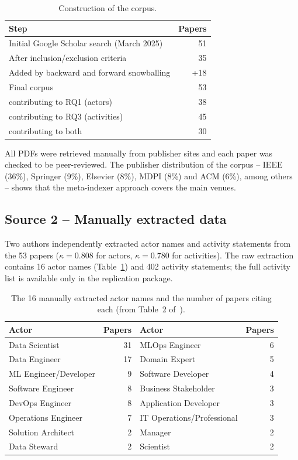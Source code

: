 \documentclass[11pt,a4paper]{article}
\begin{document}
\begin{table}[h]
\centering
\caption{Construction of the corpus.}
\small
\begin{tabular}{@{}lr@{}}
\toprule
Step & Papers \\
\midrule
Initial Google Scholar search (March 2025) & 51 \\
After inclusion/exclusion criteria & 35 \\
Added by backward and forward snowballing & +18 \\
Final corpus & 53 \\
\quad contributing to RQ1 (actors) & 38 \\
\quad contributing to RQ3 (activities) & 45 \\
\quad contributing to both & 30 \\
\bottomrule
\end{tabular}
\end{table}

All PDFs were retrieved manually from publisher sites and each paper was checked to be peer-reviewed. The publisher distribution of the corpus -- IEEE (36\%), Springer (9\%), Elsevier (8\%), MDPI (8\%) and ACM (6\%), among others -- shows that the meta-indexer approach covers the main venues.

\subsection{Source 2 -- Manually extracted data}

Two authors independently extracted actor names and activity statements from the 53 papers ($\kappa = 0.808$ for actors, $\kappa = 0.780$ for activities). The raw extraction contains 16 actor names (Table~\ref{tab:actors}) and 402 activity statements; the full activity list is available only in the replication package.

\begin{table}[h]
\centering
\caption{The 16 manually extracted actor names and the number of papers citing each (from Table~2 of~\cite{daoud2026}).}\label{tab:actors}
\small
\begin{tabular}{@{}lrlr@{}}
\toprule
Actor & Papers & Actor & Papers \\
\midrule
Data Scientist & 31 & MLOps Engineer & 6 \\
Data Engineer & 17 & Domain Expert & 5 \\
ML Engineer/Developer & 9 & Software Developer & 4 \\
Software Engineer & 8 & Business Stakeholder & 3 \\
DevOps Engineer & 8 & Application Developer & 3 \\
Operations Engineer & 7 & IT Operations/Professional & 3 \\
Solution Architect & 2 & Manager & 2 \\
Data Steward & 2 & Scientist & 2 \\
\bottomrule
\end{tabular}
\end{table}
\end{document}
